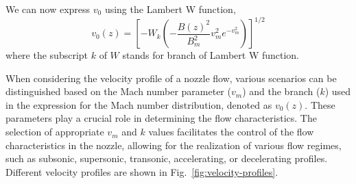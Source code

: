 We can now express $v_0$ using the Lambert W function,
\begin{equation}
	v_0(z) = \left[ -W_k\left(-\frac{B(z)^2}{B_m^2}v_m^2e^{-v_m^2}\right) \right]^{1/2}
	\label{eq:velocity-profile}
\end{equation}
where the subscript $k$ of $W$ stands for branch of Lambert W function.

When considering the velocity profile of a nozzle flow, various scenarios can be distinguished based on the Mach number parameter ($v_m$) and the branch ($k$) used in the expression for the Mach number distribution, denoted as $v_0(z)$. These parameters play a crucial role in determining the flow characteristics. The selection of appropriate $v_m$ and $k$ values facilitates the control of the flow characteristics in the nozzle, allowing for the realization of various flow regimes, such as subsonic, supersonic, transonic, accelerating, or decelerating profiles. Different velocity profiles are shown in Fig.~\ref{fig:velocity-profiles}.
